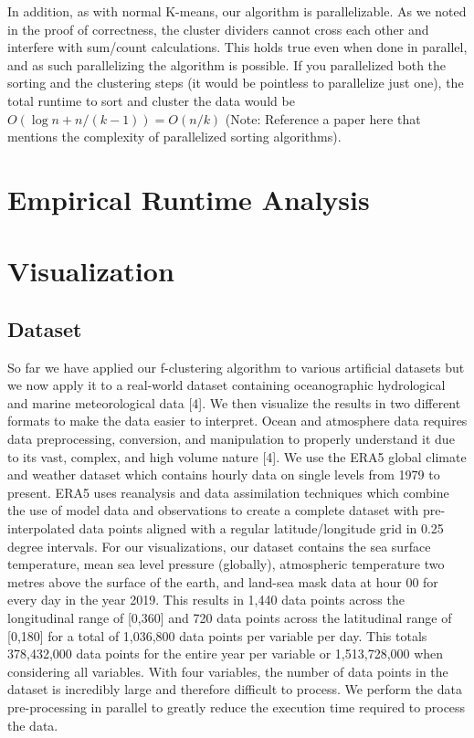 \documentclass[conference,compsoc]{IEEEtran}
\begin{document}
In addition, as with normal K-means, our algorithm is parallelizable.
As we noted in the proof of correctness, the cluster dividers cannot cross each other and interfere with sum/count calculations.
This holds true even when done in parallel, and as such parallelizing the algorithm is possible.
If you parallelized both the sorting and the clustering steps (it would be pointless to parallelize just one), 
the total runtime to sort and cluster the data would be $O(\log n + n/(k-1)) = O(n/k)$ (Note: Reference a paper here that mentions the complexity of parallelized sorting algorithms).

\section{Empirical Runtime Analysis}

\section{Visualization}
\subsection{Dataset}

So far we have applied our f-clustering algorithm to various artificial datasets but we now apply it to a real-world dataset containing oceanographic hydrological and marine meteorological data [4]. We then visualize the results in two different formats to make the data easier to interpret. Ocean and atmosphere data requires data preprocessing, conversion, and manipulation to properly understand it due to its vast, complex, and high volume nature [4]. We use the ERA5 global climate and weather dataset which contains hourly data on single levels from 1979 to present. ERA5 uses reanalysis and data assimilation techniques which combine the use of model data and observations to create a complete dataset with pre-interpolated data points aligned with a regular latitude/longitude grid in 0.25 degree intervals. For our visualizations, our dataset contains the sea surface temperature, mean sea level pressure (globally), atmospheric temperature two metres above the surface of the earth, and land-sea mask data at hour 00 for every day in the year 2019. This results in 1,440 data points across the longitudinal range of [0,360] and 720 data points across the latitudinal range of [0,180] for a total of 1,036,800 data points per variable per day. This totals 378,432,000 data points for the entire year per variable or 1,513,728,000 when considering all variables. With four variables, the number of data points in the dataset is incredibly large and therefore difficult to process. We perform the data pre-processing in parallel to greatly reduce the execution time required to process the data.
\end{document}
